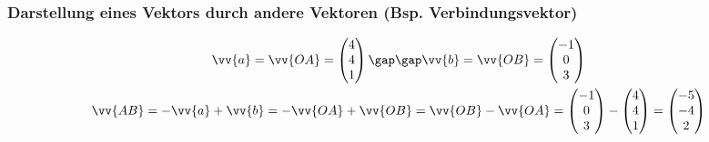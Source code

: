 \subsubsection{Darstellung eines Vektors durch andere Vektoren (Bsp. Verbindungsvektor)}
\begin{gather*}
  \vv{a} = \vv{OA} = \begin{pmatrix}4 \\ 4 \\ 1\end{pmatrix} \gap\gap \vv{b} = \vv{OB} = \begin{pmatrix}-1 \\ 0 \\ 3\end{pmatrix} \\
  \vv{AB} = -\vv{a} + \vv{b} = -\vv{OA} + \vv{OB} = \vv{OB} - \vv{OA} = \begin{pmatrix}-1 \\ 0 \\ 3\end{pmatrix} - \begin{pmatrix}4 \\ 4 \\ 1\end{pmatrix} = \begin{pmatrix}-5 \\ -4 \\ 2\end{pmatrix}
\end{gather*}
